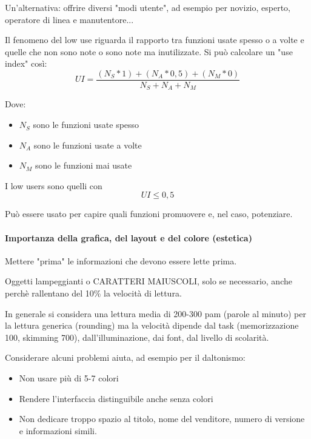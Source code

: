 \documentclass[11pt,a4paper]{book}
\begin{document}
Un'alternativa: offrire diversi "modi utente", ad esempio per novizio, esperto, operatore di linea e manutentore...

Il fenomeno del low use riguarda il rapporto tra funzioni usate spesso o a volte e quelle che non sono note o sono note ma inutilizzate. Si può calcolare un "use index" così:
$$UI=\dfrac{(N_{S}*1) + (N_{A}*0,5) + (N_{M}*0)}{N_{S}+N_{A}+N_{M}}$$

Dove:
\begin{itemize}
	\item[] $N_{S}$ sono le funzioni usate spesso
	\item[] $N_{A}$ sono le funzioni usate a volte
	\item[] $N_{M}$ sono le funzioni mai usate
\end{itemize}

\begin{center}
I low users sono quelli con $$UI \leq 0,5$$
\end{center}

Può essere usato per capire quali funzioni promuovere e, nel caso, potenziare.

\paragraph{Importanza della grafica, del layout e del colore (estetica)}
Mettere "prima" le informazioni che devono essere lette prima.

Oggetti lampeggianti o CARATTERI MAIUSCOLI, solo se necessario, anche perchè rallentano del 10\% la velocità di lettura.

In generale si considera una lettura media di 200-300 pam (parole al minuto) per la lettura generica (rounding) ma la velocità dipende dal task (memorizzazione 100, skimming 700), dall'illuminazione, dai font, dal livello di scolarità.

Considerare alcuni problemi aiuta, ad esempio per il daltonismo:
\begin{itemize}
	\item Non usare più di 5-7 colori
	\item Rendere l'interfaccia distinguibile anche senza colori
	\item Non dedicare troppo spazio al titolo, nome del venditore, numero di versione e informazioni simili.
\end{itemize}
\end{document}
